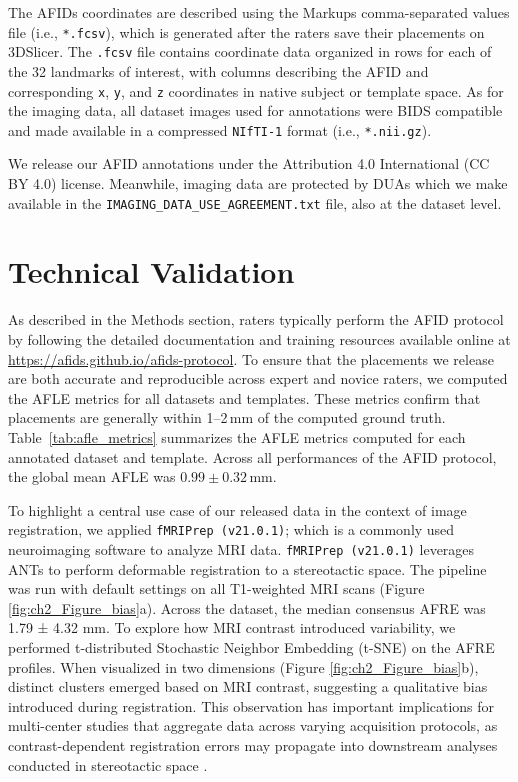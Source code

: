 The AFIDs coordinates are described using the Markups comma-separated values file (i.e., \texttt{*.fcsv}), which is generated after the raters save their placements on 3DSlicer. The \texttt{.fcsv} file contains coordinate data organized in rows for each of the 32 landmarks of interest, with columns describing the AFID and corresponding \texttt{x}, \texttt{y}, and \texttt{z} coordinates in native subject or template space. As for the imaging data, all dataset images used for annotations were BIDS compatible and made available in a compressed \texttt{NIfTI-1} format (i.e., \texttt{*.nii.gz}).

We release our AFID annotations under the Attribution 4.0 International (CC BY 4.0) license. Meanwhile, imaging data are protected by DUAs which we make available in the \texttt{IMAGING\_DATA\_USE\_AGREEMENT.txt} file, also at the dataset level.


\section{Technical Validation}
As described in the Methods section, raters typically perform the AFID protocol by following the detailed documentation and training resources available online at \url{https://afids.github.io/afids-protocol}. To ensure that the placements we release are both accurate and reproducible across expert and novice raters, we computed the AFLE metrics for all datasets and templates. These metrics confirm that placements are generally within 1–2\,mm of the computed ground truth.  Table~\ref{tab:afle_metrics} summarizes the AFLE metrics computed for each annotated dataset and template. Across all performances of the AFID protocol, the global mean AFLE was $0.99 \pm 0.32$\,mm.

To highlight a central use case of our released data in the context of image registration, we applied \texttt{fMRIPrep (v21.0.1)}; \cite{Esteban2019-oz} which is a commonly used neuroimaging software to analyze MRI data. \texttt{fMRIPrep (v21.0.1)} leverages ANTs \cite{Avants2008-ek} to perform deformable registration to a stereotactic space. The pipeline was run with default settings on all T1-weighted MRI scans (Figure \ref{fig:ch2_Figure_bias}a). Across the dataset, the median consensus AFRE was 1.79 ± 4.32 mm. To explore how MRI contrast introduced variability, we performed t-distributed Stochastic Neighbor Embedding (t-SNE) on the AFRE profiles. When visualized in two dimensions (Figure \ref{fig:ch2_Figure_bias}b), distinct clusters emerged based on MRI contrast, suggesting a qualitative bias introduced during registration. This observation has important implications for multi-center studies that aggregate data across varying acquisition protocols, as contrast-dependent registration errors may propagate into downstream analyses conducted in stereotactic space \cite{Hollunder2024-wc,Middlebrooks2024-gb}.

